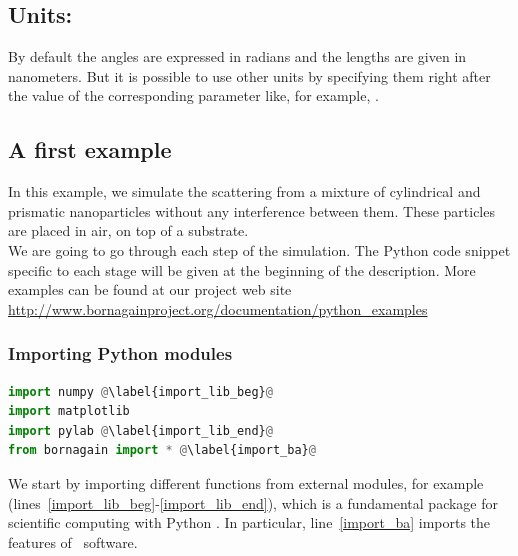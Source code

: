 

\subsection{Units:}

By default the angles are expressed in radians and the lengths are given in
nanometers.  But it is possible to use other units by
specifying them right after the value of the corresponding
parameter like, for example, .


\subsection{A first example} \label{sec:Example1Python}

In this example, we simulate the scattering from a mixture of
cylindrical and prismatic nanoparticles without any interference
between them. These particles are placed in air, on top
of a substrate.\\ We are going to go through each step of the
simulation. The Python code snippet specific to each stage will be given at
the beginning of the description.
More examples can be found at our project web site \url{http://www.bornagainproject.org/documentation/python_examples}


\subsubsection{Importing Python modules}

\begin{lstlisting}[language=python, style=eclipseboxed,name=ex1,nolol]
import numpy @\label{import_lib_beg}@
import matplotlib
import pylab @\label{import_lib_end}@
from bornagain import * @\label{import_ba}@
\end{lstlisting}
We start by importing different functions from external
modules, for example  (lines~\ref{import_lib_beg}-\ref{import_lib_end}), which
is a fundamental package for scientific computing with Python
\cite{s:numpy}.  In particular, line~\ref{import_ba}
imports the features of \BornAgain\ software.

